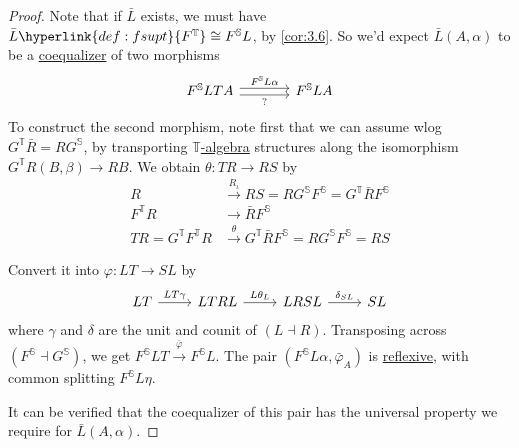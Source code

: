 \documentclass{article}
\let\to\longrightarrow
\begin{document}
\begin{proof}
  Note that if $\bar{L}$ exists, we must have $\bar{L} \hyperlink{def:fsupt}{F^\mathbb{T}} \cong F^\mathbb{S} L$, by \cref{cor:3.6}.
  So we'd expect $\bar{L}(A,\alpha)$ to be a \hyperlink{def:equalizer}{coequalizer} of two morphisms
  \begin{equation*}
    \begin{tikzcd}[column sep=large]
      F^\mathbb{S} L T A \rar[shift left]{F^\mathbb{S} L \alpha} \rar[shift right,']{?} & F^\mathbb{S} L A
    \end{tikzcd}
  \end{equation*}
  To construct the second morphism, note first that we can assume wlog $G^\mathbb{T} \bar{R} = R G^\mathbb{S}$, by transporting \hyperlink{def:em}{$\mathbb{T}$-algebra} structures along the isomorphism $G^\mathbb{T} R(B, \beta) \to RB$.
  We obtain $\theta: TR \to RS$ by
  \begin{align*}
    R &\overset{R_\iota}\to RS = RG^\mathbb{S} F^\mathbb{S} = G^\mathbb{T} \bar{R} F^\mathbb{S} \\
    F^\mathbb{T} R &\to \bar{R} F^\mathbb{S} \\
    TR = G^\mathbb{T} F^\mathbb{T} R &\overset{\theta}\to G^\mathbb{T} \bar{R} F^\mathbb{S} = R G^\mathbb{S} F^\mathbb{S} = RS
  \end{align*}

  Convert it into $\varphi: LT \to SL$ by
  \begin{equation*}
    \begin{tikzcd}
      LT \rar{LT\gamma} & LTRL \rar{L\theta_L} & LRSL \rar{\delta_{SL}} & SL
    \end{tikzcd}
  \end{equation*}
  where $\gamma$ and $\delta$ are the unit and counit of $(L \dashv R)$.
  Transposing across $(F^\mathbb{S} \dashv G^\mathbb{S})$, we get $F^\mathbb{S} LT \overset{\bar{\varphi}}\to F^\mathbb{S} L$.
  The pair $(F^\mathbb{S} L \alpha, \bar{\varphi}_A)$ is \hyperlink{def:reflexive}{reflexive}, with common splitting $F^\mathbb{S} L \eta$.

  It can be verified that the coequalizer of this pair has the universal property we require for $\bar{L}(A,\alpha)$.
\end{proof}

\clearpage
\end{document}
